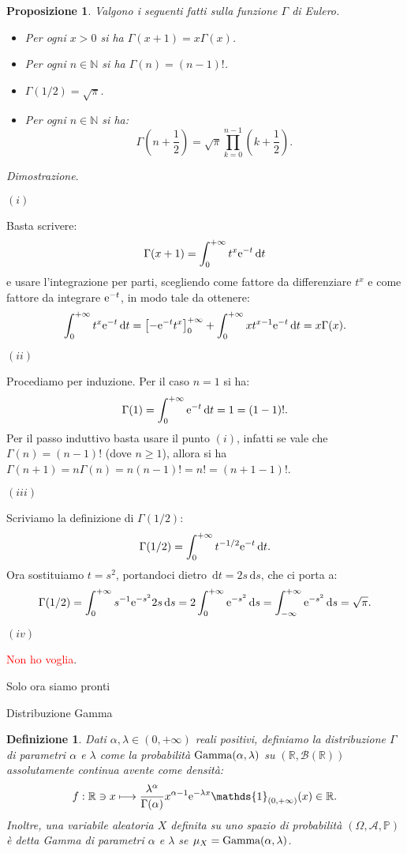 \documentclass[11pt]{book}
\makeatletter
\theoremstyle{Definizione}
\newtheorem*{mydef}{Definizione}
\theoremstyle{TeoremaProposizioneLemmaCorollario}
\newtheorem{mypropo}[myteo]{Proposizione}
\theoremstyle{OsservazioneNota}
\renewenvironment{proof}[1][\proofname]{\par
  \normalfont \topsep6\p@\@plus6\p@\relax
  \trivlist
  \item[\hskip\labelsep
        \itshape
    #1\@addpunct{.}]\ignorespaces
}{%
  \endtrivlist\@endpefalse
}
\newcommand{\R}{\mathbb{R}}
\newcommand{\N}{\mathbb{N}}
\renewcommand{\P}{\mathbb{P}}
\renewcommand{\d}{\mathrm{d}}
\newcommand{\dt}{\,\d t}
\newcommand{\ds}{\,\d s}
\newcommand{\e}{\textup{e}}
\newcommand{\uno}[1]{\mathds{1}_{#1}}
\renewenvironment{proof}{\textsl{Dimostrazione}.}{}
\makeatother
\begin{document}
\begin{boxpro}
\begin{mypropo}
Valgono i seguenti fatti sulla funzione $\Gamma$ di Eulero.
\begin{itemize}
\item[$(i)$] Per ogni $x > 0$ si ha $\Gamma(x+1) = x \Gamma(x)$.
\item[$(ii)$] Per ogni $n\in \N$ si ha $\Gamma(n) = (n-1)!$.
\item[$(iii)$] $\Gamma(1/2) = \sqrt{\pi}$.
\item[$(iv)$] Per ogni $n\in \N$ si ha:
$$
\Gamma\left(n+\frac{1}{2}\right) = \sqrt{\pi}\prod_{k = 0}^{n-1} \left(k+\frac{1}{2}\right).
$$
\end{itemize}
\end{mypropo}
\tcblower
\begin{proof}
\hfill
\begin{flushleft}
$(i)$
\end{flushleft}
Basta scrivere:
$$
\Gamma(x+1) = \int_{0}^{+\infty} t^x \e^{-t}\dt
$$
e usare l'integrazione per parti, scegliendo come fattore da differenziare $t^{x}$ e come fattore da integrare $\e^{-t}$, in modo tale da ottenere:
$$
\int_{0}^{+\infty} t^x \e^{-t}\dt = \left[-\e^{-t}t^x\right]_0^{+\infty} + \int_{0}^{+\infty} x t^{x-1} \e^{-t}\dt = x \Gamma(x).
$$
\begin{flushleft}
$(ii)$
\end{flushleft}
Procediamo per induzione. Per il caso $n = 1$ si ha:
$$
\Gamma(1) = \int_0^{+\infty} \e^{-t}\dt = 1 = (1-1)!.
$$
Per il passo induttivo basta usare il punto $(i)$, infatti se vale che $\Gamma(n) = (n-1)!$ (dove $n \geq 1$), allora si ha $\Gamma(n+1) = n \Gamma(n) = n(n-1)! = n! = (n+1-1)!$.
\begin{flushleft}
$(iii)$
\end{flushleft}
Scriviamo la definizione di $\Gamma(1/2)$:
$$
\Gamma(1/2) = \int_0^{+\infty} t^{-1/2}\e^{-t}\dt.
$$
Ora sostituiamo $t = s^2$, portandoci dietro $\dt = 2s \ds$, che ci porta a:
$$
\Gamma(1/2) = \int_0^{+\infty} s^{-1}\e^{-s^2} 2s \ds = 2 \int_{0}^{+\infty}\e^{-s^2}\ds = \int_{-\infty}^{+\infty} \e^{-s^2}\ds = \sqrt{\pi}.
$$
\begin{flushleft}
$(iv)$
\end{flushleft}
\textcolor{red}{Non ho voglia}.
\end{proof}
\end{boxpro}
\noindent
Solo ora siamo pronti
\begin{boxdef}{Distribuzione Gamma}
\begin{mydef}
Dati $\alpha,\lambda\in (0,+\infty)$ reali positivi, definiamo la distribuzione $\Gamma$ di parametri $\alpha$ e $\lambda$ come la probabilità $\textup{Gamma}(\alpha,\lambda)$ su $(\R,\mathcal{B}(\R))$ assolutamente continua avente come densità:
$$
f:\R \ni x \longmapsto \frac{\lambda^\alpha}{\Gamma(\alpha)}x^{\alpha-1}\e^{-\lambda x} \uno{(0,+\infty)}(x)\in \R.
$$
Inoltre, una variabile aleatoria $X$ definita su uno spazio di probabilità $(\Omega,\mathcal{A},\P)$ è detta Gamma di parametri $\alpha$ e $\lambda$ se $\mu_X = \textup{Gamma}(\alpha,\lambda)$.
\end{mydef}
\end{boxdef}
\end{document}
